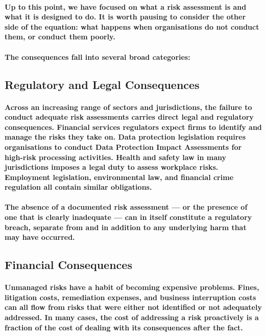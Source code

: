 \paragraph{Up to this point, we have focused on what a risk assessment is and what it is designed to do. It is worth pausing to consider the other side of the equation: \textbf{what happens when organisations do not conduct them, or conduct them poorly}.}

\paragraph{The consequences fall into several broad categories:}

\subsection{Regulatory and Legal Consequences}

\paragraph{Across an increasing range of sectors and jurisdictions, the failure to conduct adequate risk assessments carries direct legal and regulatory consequences. Financial services regulators expect firms to identify and manage the risks they take on. Data protection legislation requires organisations to conduct Data Protection Impact Assessments for high-risk processing activities. Health and safety law in many jurisdictions imposes a legal duty to assess workplace risks. Employment legislation, environmental law, and financial crime regulation all contain similar obligations.}

\paragraph{The absence of a documented risk assessment — or the presence of one that is clearly inadequate — can in itself constitute a regulatory breach, separate from and in addition to any underlying harm that may have occurred.}

\subsection{Financial Consequences}

\paragraph{Unmanaged risks have a habit of becoming expensive problems. Fines, litigation costs, remediation expenses, and business interruption costs can all flow from risks that were either not identified or not adequately addressed. In many cases, the cost of addressing a risk proactively is a fraction of the cost of dealing with its consequences after the fact.}

